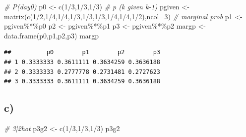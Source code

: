 \documentclass[
]{article}
\newenvironment{Shaded}{\begin{snugshade}}{\end{snugshade}}
\newcommand{\AttributeTok}[1]{\textcolor[rgb]{0.77,0.63,0.00}{#1}}
\newcommand{\CommentTok}[1]{\textcolor[rgb]{0.56,0.35,0.01}{\textit{#1}}}
\newcommand{\DecValTok}[1]{\textcolor[rgb]{0.00,0.00,0.81}{#1}}
\newcommand{\FunctionTok}[1]{\textcolor[rgb]{0.00,0.00,0.00}{#1}}
\newcommand{\NormalTok}[1]{#1}
\newcommand{\OtherTok}[1]{\textcolor[rgb]{0.56,0.35,0.01}{#1}}
\newcommand{\SpecialCharTok}[1]{\textcolor[rgb]{0.00,0.00,0.00}{#1}}
\begin{document}
\begin{Shaded}
\begin{Highlighting}[]
\CommentTok{\# P(day0)}
\NormalTok{p0 }\OtherTok{\textless{}{-}} \FunctionTok{c}\NormalTok{(}\DecValTok{1}\SpecialCharTok{/}\DecValTok{3}\NormalTok{,}\DecValTok{1}\SpecialCharTok{/}\DecValTok{3}\NormalTok{,}\DecValTok{1}\SpecialCharTok{/}\DecValTok{3}\NormalTok{)}
\CommentTok{\# p (k given k{-}1)}
\NormalTok{pgiven }\OtherTok{\textless{}{-}} \FunctionTok{matrix}\NormalTok{(}\FunctionTok{c}\NormalTok{(}\DecValTok{1}\SpecialCharTok{/}\DecValTok{2}\NormalTok{,}\DecValTok{1}\SpecialCharTok{/}\DecValTok{4}\NormalTok{,}\DecValTok{1}\SpecialCharTok{/}\DecValTok{4}\NormalTok{,}\DecValTok{1}\SpecialCharTok{/}\DecValTok{3}\NormalTok{,}\DecValTok{1}\SpecialCharTok{/}\DecValTok{3}\NormalTok{,}\DecValTok{1}\SpecialCharTok{/}\DecValTok{3}\NormalTok{,}\DecValTok{1}\SpecialCharTok{/}\DecValTok{4}\NormalTok{,}\DecValTok{1}\SpecialCharTok{/}\DecValTok{4}\NormalTok{,}\DecValTok{1}\SpecialCharTok{/}\DecValTok{2}\NormalTok{),}\AttributeTok{ncol=}\DecValTok{3}\NormalTok{)}
\CommentTok{\# marginal prob}
\NormalTok{p1 }\OtherTok{\textless{}{-}}\NormalTok{ pgiven}\SpecialCharTok{\%*\%}\NormalTok{p0}
\NormalTok{p2 }\OtherTok{\textless{}{-}}\NormalTok{ pgiven}\SpecialCharTok{\%*\%}\NormalTok{p1}
\NormalTok{p3 }\OtherTok{\textless{}{-}}\NormalTok{ pgiven}\SpecialCharTok{\%*\%}\NormalTok{p2}
\NormalTok{margp }\OtherTok{\textless{}{-}} \FunctionTok{data.frame}\NormalTok{(p0,p1,p2,p3)}
\NormalTok{margp}
\end{Highlighting}
\end{Shaded}

\begin{verbatim}
##          p0        p1        p2        p3
## 1 0.3333333 0.3611111 0.3634259 0.3636188
## 2 0.3333333 0.2777778 0.2731481 0.2727623
## 3 0.3333333 0.3611111 0.3634259 0.3636188
\end{verbatim}

\hypertarget{c}{%
\subsection{c)}\label{c}}

\begin{Shaded}
\begin{Highlighting}[]
\CommentTok{\# 3|2hot }
\NormalTok{p3g2 }\OtherTok{\textless{}{-}} \FunctionTok{c}\NormalTok{(}\DecValTok{1}\SpecialCharTok{/}\DecValTok{3}\NormalTok{,}\DecValTok{1}\SpecialCharTok{/}\DecValTok{3}\NormalTok{,}\DecValTok{1}\SpecialCharTok{/}\DecValTok{3}\NormalTok{)}
\NormalTok{p3g2}
\end{Highlighting}
\end{Shaded}
\end{document}
